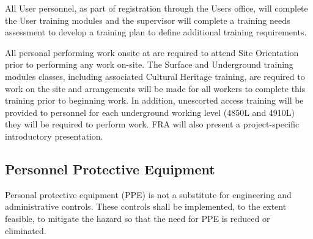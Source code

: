 All User personnel, as part of registration through the Users office,
will complete the User  training modules and the supervisor
will complete a training needs assessment to develop a training plan
to define additional  training requirements.

All personal performing work onsite at \surf are required to attend
\surf {} Site Orientation prior to performing any work
on-site.  The \surf Surface and Underground training modules classes,
including associated Cultural Heritage training, are required to work
on the site and arrangements will be made for all workers to complete
this training prior to beginning work. In addition, unescorted access
training will be provided to personnel for each underground working
level (4850L and 4910L) they will be required to perform work.  FRA
will also present a project-specific introductory 
presentation. 

\subsection{Personnel Protective Equipment}

Personal protective equipment (PPE) is not a substitute for
engineering and administrative controls. These controls shall be
implemented, to the extent feasible, to mitigate the hazard so that
the need for PPE is reduced or eliminated.

